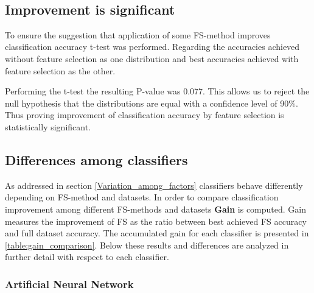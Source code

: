 \begin{table}[h]
  \centering
   \\
  \caption[]%
  {{\small Classification accuracy achieved by SVM. Accuracy was improved or equivalent on every dataset with use of feature selection. Rows represent feature selection method, columns represent dataset, bold font indicates the highest value.}}
  \label{table:SVM}
\end{table}

\subsection{Improvement is significant}

To ensure the suggestion that application of some FS-method improves classification accuracy t-test was performed. Regarding the accuracies achieved without feature selection as one distribution and best accuracies achieved with feature selection as the other.

Performing the t-test the resulting P-value was 0.077. This allows us to reject the null hypothesis that the distributions are equal with a confidence level of 90\%. Thus proving improvement of classification accuracy by feature selection is statistically significant.

\subsection{Differences among classifiers}

As addressed in section \ref{Variation_among_factors} classifiers behave differently depending on FS-method and datasets.
In order to compare classification improvement among different FS-methods and datasets \textbf{Gain} is computed. Gain measures the improvement of FS as the ratio between best achieved FS accuracy and full dataset accuracy. The accumulated gain for each classifier is presented in \ref{table:gain_comparison}. Below these results and differences are analyzed in further detail with respect to each classifier.

\begin{table}[hp]
  
  \caption[]%
  {{\small Ranking of which classifiers gained most accuracy when comparing feature selection to full dataset.}}
  \label{table:gain_comparison}
\end{table}

\subsubsection{Artificial Neural Network}

